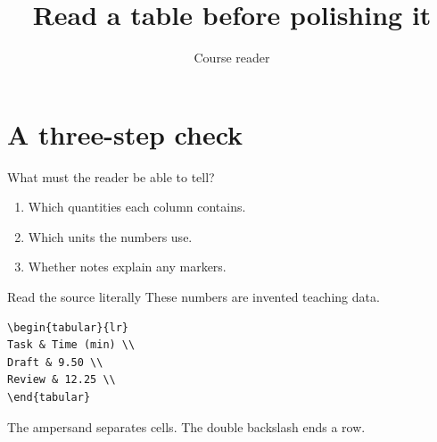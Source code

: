 \documentclass[aspectratio=169]{beamer}
\title{Read a table before polishing it}
\author{Course reader}
\date{}
\begin{document}
\begin{frame}
\titlepage
\end{frame}

\section{A three-step check}
\begin{frame}[t]{What must the reader be able to tell?}
\begin{enumerate}
\item<1-> Which quantities each column contains.
\item<2-> Which units the numbers use.
\item<3-> Whether notes explain any markers.
\end{enumerate}
\vspace{1em}
\end{frame}

\begin{frame}[fragile]{Read the source literally}
These numbers are invented teaching data.
\begin{verbatim}
\begin{tabular}{lr}
Task & Time (min) \\
Draft & 9.50 \\
Review & 12.25 \\
\end{tabular}
\end{verbatim}
The ampersand separates cells. The double backslash ends a row.
\end{frame}
\end{document}
